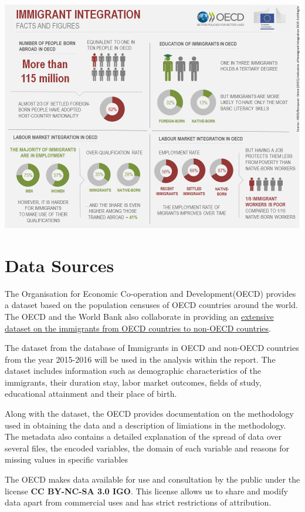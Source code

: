 \documentclass[11pt,a4paper,]{article}
\let\origfigure\figure
\let\endorigfigure\endfigure
\renewenvironment{figure}[1][2] {
    \expandafter\origfigure\expandafter[H]
} {
    \endorigfigure
}%
\begin{document}
\begin{figure}
\centering
\includegraphics{data/image.png}
\caption{Migration Facts and Figures}
\end{figure}

\section*{Data Sources}

The Organisation for Economic Co-operation and Development(OECD) provides a dataset based on the population censuses of OECD countries around the world. The OECD and the World Bank also collaborate in providing an \href{http://www.oecd.org/els/mig/dioc.htm}{extensive dataset on the immigrants from OECD countries to non-OECD countries}.

The dataset from the database of Immigrants in OECD and non-OECD countries from the year 2015-2016 will be used in the analysis within the report. The dataset includes information such as demographic characteristics of the immigrants, their duration stay, labor market outcomes, fields of study, educational attainment and their place of birth.

Along with the dataset, the OECD provides documentation on the methodology used in obtaining the data and a description of limiations in the methodology. The metadata also contains a detailed explanation of the spread of data over several files, the encoded variables, the domain of each variable and reasons for missing values in specific variables

The OECD makes data available for use and consultation by the public under the license \textbf{CC BY-NC-SA 3.0 IGO}. This license allows us to share and modify data apart from commercial uses and has strict restrictions of attribution.
\end{document}
